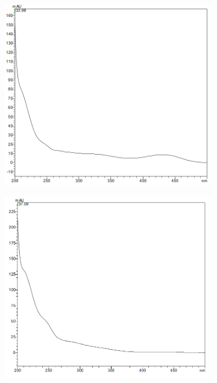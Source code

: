 \begin{figure}[!htbp]
  \begin{subfigure}[b]{0.5\textwidth}
    \includegraphics[width=\textwidth]{figures/Kapitel6/Reaktion3h/YCC3398.png}
    \caption{}
    \label{fig:YCC3398}
  \end{subfigure}
  \hfill
  \begin{subfigure}[b]{0.5\textwidth}
    \includegraphics[width=\textwidth]{figures/Kapitel6/Reaktion3h/DNCC3709.png}
    \caption{}
    \label{fig:DNCC3709}
  \end{subfigure}
  

\end{figure}
